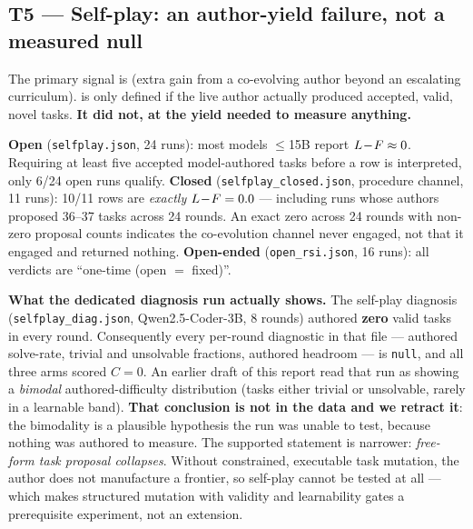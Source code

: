 
\subsection{T5 --- Self-play: an author-yield failure, not a measured null}
The primary signal is \lf{} (extra gain from a co-evolving author beyond an escalating curriculum). \lf{} is
only defined if the live author actually produced accepted, valid, novel tasks. \textbf{It did not, at the
yield needed to measure anything.}

\textbf{Open} (\texttt{selfplay.json}, 24 runs): most models $\le$15B report $L\!-\!F\approx0$. Requiring at least
five accepted model-authored tasks before a row is interpreted, only 6/24 open runs qualify.
\textbf{Closed} (\texttt{selfplay\_closed.json}, procedure channel, 11 runs): 10/11 rows are \emph{exactly}
$L\!-\!F=0.0$ --- including runs whose authors proposed 36--37 tasks across 24 rounds. An exact zero across 24
rounds with non-zero proposal counts indicates the co-evolution channel never engaged, not that it engaged and
returned nothing. \textbf{Open-ended} (\texttt{open\_rsi.json}, 16 runs): all verdicts are ``one-time
(open $=$ fixed)''.


\noindent\textbf{What the dedicated diagnosis run actually shows.} The self-play diagnosis
(\texttt{selfplay\_diag.json}, Qwen2.5-Coder-3B, 8 rounds) authored \textbf{zero} valid tasks in every round.
Consequently every per-round diagnostic in that file --- authored solve-rate, trivial and unsolvable
fractions, authored headroom --- is \texttt{null}, and all three arms scored $C{=}0$. An earlier draft of this
report read that run as showing a \emph{bimodal} authored-difficulty distribution (tasks either trivial or
unsolvable, rarely in a learnable band). \textbf{That conclusion is not in the data and we retract it}: the
bimodality is a plausible hypothesis the run was unable to test, because nothing was authored to measure. The
supported statement is narrower: \emph{free-form task proposal collapses}. Without constrained, executable
task mutation, the author does not manufacture a frontier, so self-play cannot be tested at all --- which
makes structured mutation with validity and learnability gates a prerequisite experiment, not an extension.

